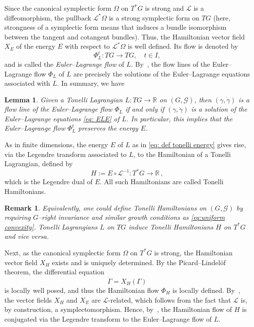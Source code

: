 \documentclass[11pt,reqno]{amsart}
\theoremstyle{plain}
\newtheorem{lem}[thm]{Lemma}
\newtheorem{rem}[thm]{Remark}
\theoremstyle{definition}
\theoremstyle{plain} %
\newtheorem{lem}[lem]{Lemma}
\newtheorem{rem}[rem]{Remark}
\theoremstyle{definition} %
\numberwithin{equation}{section}
\def\G{\mathcal{G}}
\def\RR{{\mathbb R}}
\begin{document}
Since the canonical symplectic form $\Omega$ on $T^*G$ is strong and $\mathcal{L}$ is a diffeomorphism, 
the pullback $\mathcal{L}^*\Omega$ is a strong symplectic form on $TG$ (here, strongness of a symplectic form means that induces a bundle isomorphism between the tangent and cotangent bundles).
Thus, the Hamiltonian vector field $X_E$ of the energy $E$ with respect to $\mathcal{L}^*\Omega$ is well defined. 
Its flow is denoted by 
\[
\Phi_L^t : TG \longrightarrow TG, \quad t \in I,
\]
and is called the \emph{Euler--Lagrange flow} of $L$.  
By~\cite[Thm.~7.3.3]{MardsenRatiuMechanics}, the flow lines of the Euler--Lagrange flow \( \Phi_L \) of \( L \) 
are precisely the solutions of the Euler--Lagrange equations associated with \( L \). 
In summary, we have 
\begin{lem}\label{lemm: ele define EL-flow}
    Given a Tonelli Lagrangian $L : TG \to \RR$ on $(G, \G)$, 
    then $(\gamma, \dot{\gamma})$ is a flow line of the Euler–Lagrange flow $\Phi_L$
    if and only if $(\gamma, \dot{\gamma})$ is a solution of the Euler–Lagrange equations \eqref{eq: ELE} of $L$.
    In particular, this implies that the Euler–Lagrange flow $\varPhi_L^t$ preserves the energy $E$.
\end{lem}
As in finite dimensions, the energy $E$ of $L$ as in \eqref{eq: def tonelli energy} gives rise, via the Legendre transform associated to $L$, to the Hamiltonian of a Tonelli Lagrangian, defined by  
\begin{equation}\label{eq: def tonelli Hamiltonian}
    H := E \circ \mathcal{L}^{-1} : T^*G \longrightarrow \RR \, ,
\end{equation}
which is the Legendre dual of $E$. All such Hamiltonians are called Tonelli Hamiltonians.

\begin{rem}
    Equivalently, one could define \emph{Tonelli Hamiltonians} on $(G, \G)$ by requiring $G$–right invariance and similar growth conditions as \eqref{eq:uniform convexity}.
    Tonelli Lagrangians $L$ on $TG$ induce Tonelli Hamiltonians $H$ on $T^*G$ and vice versa. 
\end{rem}


Next, as the canonical symplectic form $\Omega$ on $T^*G$ is strong, the Hamiltonian vector field $X_H$ exists and is uniquely determined. 
By the Picard–Lindelöf theorem, the differential equation 
\[
\dot{\Gamma} = X_H(\Gamma)
\]
is locally well posed, and thus the Hamiltonian flow $\Phi_H$ is locally defined. 
By~\cite[Prop.~7.4.1]{MardsenRatiuMechanics}, the vector fields $X_H$ and $X_E$ are $\mathcal{L}$-related, 
which follows from the fact that $\mathcal{L}$ is, by construction, a symplectomorphism. 
Hence, by~\cite[Thm.~7.4.3]{MardsenRatiuMechanics}, 
the Hamiltonian flow of \( H \) is conjugated via the Legendre transform 
to the Euler–Lagrange flow of \( L \). 
\end{document}
